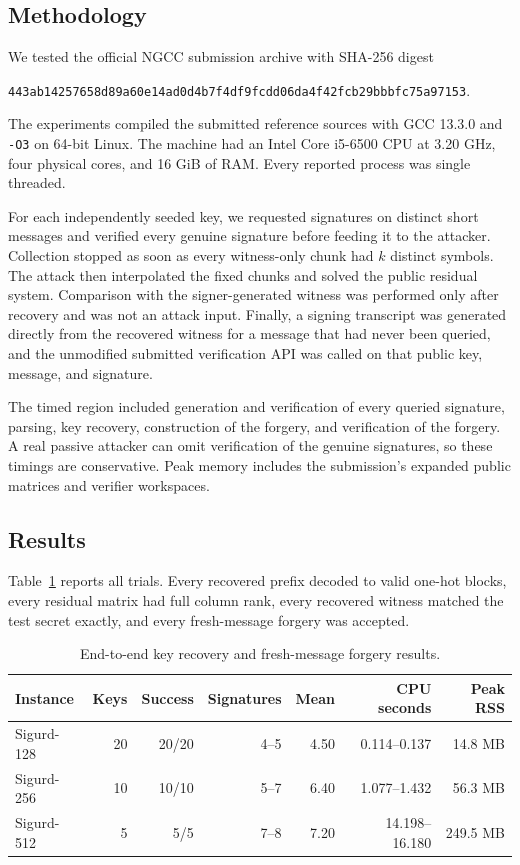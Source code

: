 \documentclass[11pt,a4paper]{article}
\begin{document}
\subsection{Methodology}

We tested the official NGCC submission archive with SHA-256 digest
\begin{center}
\texttt{443ab14257658d89a60e14ad0d4b7f4df9fcdd06da4f42fcb29bbbfc75a97153}.
\end{center}
The experiments compiled the submitted reference sources with GCC 13.3.0 and
\texttt{-O3} on 64-bit Linux.  The machine had an Intel Core i5-6500 CPU at
3.20 GHz, four physical cores, and 16 GiB of RAM.  Every reported process was
single threaded.

For each independently seeded key, we requested signatures on distinct short
messages and verified every genuine signature before feeding it to the
attacker.  Collection stopped as soon as every witness-only chunk had $k$
distinct symbols.  The attack then interpolated the fixed chunks and solved the
public residual system.  Comparison with the signer-generated witness was
performed only after recovery and was not an attack input.  Finally, a signing
transcript was generated directly from the recovered witness for a message
that had never been queried, and the unmodified submitted verification API was
called on that public key, message, and signature.

The timed region included generation and verification of every queried
signature, parsing, key recovery, construction of the forgery, and verification
of the forgery.  A real passive attacker can omit verification of the genuine
signatures, so these timings are conservative.  Peak memory includes the
submission's expanded public matrices and verifier workspaces.

\subsection{Results}

Table~\ref{tab:results} reports all trials.  Every recovered prefix decoded to
valid one-hot blocks, every residual matrix had full column rank, every
recovered witness matched the test secret exactly, and every fresh-message
forgery was accepted.

\begin{table}[ht]
\centering
\caption{End-to-end key recovery and fresh-message forgery results.}
\label{tab:results}
\small
\begin{tabular}{@{}lrrrrrr@{}}
\toprule
Instance & Keys & Success & Signatures & Mean & CPU seconds & Peak RSS \\
\midrule
Sigurd-128 & 20 & 20/20 & 4--5 & 4.50 & 0.114--0.137 & 14.8 MB \\
Sigurd-256 & 10 & 10/10 & 5--7 & 6.40 & 1.077--1.432 & 56.3 MB \\
Sigurd-512 & 5  & 5/5   & 7--8 & 7.20 & 14.198--16.180 & 249.5 MB \\
\bottomrule
\end{tabular}
\end{table}
\end{document}

